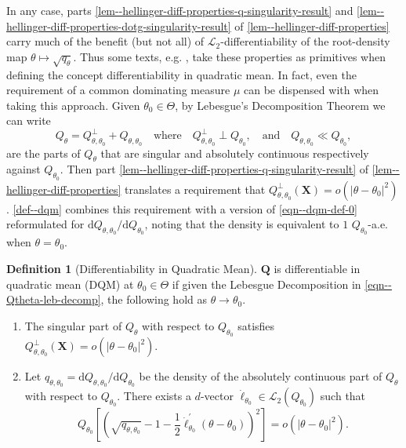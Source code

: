 \documentclass[12pt]{article}
\let\Cref\autoref
\def\L{\mathscr{L}}
\theoremstyle{definition}
\newtheorem{definition}{Definition}
\theoremstyle{plain}
\begin{document}
In any case, parts \ref{lem--hellinger-diff-properties-q-singularity-result} and
\ref{lem--hellinger-diff-properties-dotg-singularity-result} of
\Cref{lem--hellinger-diff-properties} carry much of the benefit (but not all) of
\(\L_{2}\)-differentiability of the root-density map \(\theta \mapsto
\sqrt{q_{\theta}}\).
Thus some texts, e.g. \citet{2000lecamAsymptoticsStatisticsBasic}, take these
properties as primitives when defining the concept differentiability in
quadratic mean.
In fact, even the requirement of a common dominating measure \(\mu\) can be
dispensed with when taking this approach.
Given \(\theta_{0} \in \Theta\), by Lebesgue's Decomposition Theorem we can
write
\begin{equation}
  Q_{\theta} = Q_{\theta, \theta_{0}}^{\perp} + Q_{\theta, \theta_{0}}
  \quad \text{where} \quad
  Q_{\theta, \theta_{0}}^{\perp} \perp Q_{\theta_{0}},
  \quad \text{and} \quad
  Q_{\theta, \theta_{0}} \ll Q_{\theta_{0}},
  \label{eqn--Qtheta-leb-decomp}
\end{equation}
are the parts of \(Q_{\theta}\) that are singular and absolutely continuous
respectively against \(Q_{\theta_{0}}\).
Then part \ref{lem--hellinger-diff-properties-q-singularity-result}
of \Cref{lem--hellinger-diff-properties} translates a requirement that
\(Q_{\theta, \theta_{0}}^{\perp} (\mathbf{X}) = o \left( |\theta -
\theta_{0}|^{2} \right)\).
\Cref{def--dqm} combines this requirement with a version of
\eqref{eqn--dqm-def-0} reformulated for \(\mathrm{d} Q_{\theta,
\theta_{0}} / \mathrm{d} Q_{\theta_{0}}\), noting that the density is equivalent
to \(1\)
\(Q_{\theta_{0}}\)-a.e. when \(\theta = \theta_{0}\).

\begin{definition}[Differentiability in Quadratic Mean]
\label{def--dqm}
\(\mathbf{Q}\) is differentiable in quadratic mean (DQM) at \(\theta_{0} \in
\Theta\) if given the Lebesgue Decomposition in \eqref{eqn--Qtheta-leb-decomp},
the following hold as \(\theta \to \theta_{0}\).
\begin{enumerate}[label=(\roman*)]
  \item \label{def--dqm-sing}
    The singular part of \(Q_{\theta}\) with respect to \(Q_{\theta_{0}}\)
    satisfies
    \(Q_{\theta, \theta_{0}}^{\perp} (\mathbf{X}) = o \left( \left| \theta -
    \theta_{0} \right|^{2} \right)\).
  \item \label{def--dqm-ac-diff}
    Let \(q_{\theta, \theta_{0}} = \mathrm{d} Q_{\theta, \theta_{0}} /
    \mathrm{d} Q_{\theta_{0}}\) be the density of the absolutely continuous part
    of \(Q_{\theta}\) with respect to \(Q_{\theta_{0}}\).
    There exists a \(d\)-vector \(\dot{\ell}_{\theta_{0}} \in \L_{2} \left(
    Q_{\theta_{0}} \right)\) such that
    \begin{equation}
      Q_{\theta_{0}} \left[ \left( \sqrt{q_{\theta, \theta_{0}}} - 1 -
      \frac{1}{2} \dot{\ell}_{\theta_{0}}^{\prime} \left( \theta - \theta_{0}
      \right) \right)^{2} \right] = o \left( \left| \theta - \theta_{0}
      \right|^{2} \right).
      \label{eqn--dqm-def}
    \end{equation}
\end{enumerate}
\end{definition}
\end{document}
